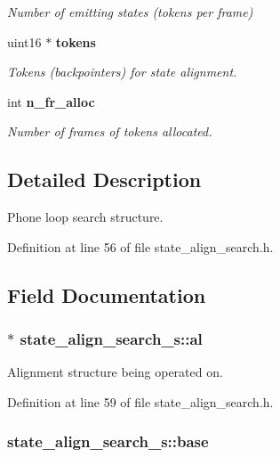 \begin{DoxyCompactItemize}
\begin{DoxyCompactList}\small\item\em Number of emitting states (tokens per frame) \end{DoxyCompactList}\item 
uint16 $\ast$ {\bf tokens}
\begin{DoxyCompactList}\small\item\em Tokens (backpointers) for state alignment. \end{DoxyCompactList}\item 
int {\bf n\-\_\-fr\-\_\-alloc}
\begin{DoxyCompactList}\small\item\em Number of frames of tokens allocated. \end{DoxyCompactList}\end{DoxyCompactItemize}


\subsection{Detailed Description}
Phone loop search structure. 

Definition at line 56 of file state\-\_\-align\-\_\-search.\-h.



\subsection{Field Documentation}
\subsubsection[{al}]{$\ast$ state\-\_\-align\-\_\-search\-\_\-s\-::al}\label{structstate__align__search__s_a47b9b509c7416f8952ee452d8ce7dda6}


Alignment structure being operated on. 



Definition at line 59 of file state\-\_\-align\-\_\-search.\-h.

\subsubsection[{base}]{ state\-\_\-align\-\_\-search\-\_\-s\-::base}\label{structstate__align__search__s_ab2a596d687e113c88a271d1397b8d9c5}


